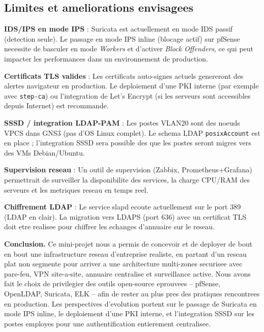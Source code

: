 \documentclass[11pt,a4paper]{article}
\begin{document}
\subsection{Limites et ameliorations envisagees}

\textbf{IDS/IPS en mode IPS} : Suricata est actuellement en mode IDS passif (detection seule). Le passage en mode IPS inline (blocage actif) sur pfSense necessite de basculer en mode \textit{Workers} et d'activer \textit{Block Offenders}, ce qui peut impacter les performances dans un environnement de production.

\textbf{Certificats TLS valides} : Les certificats auto-signes actuels genereront des alertes navigateur en production. Le deploiement d'une PKI interne (par exemple avec \texttt{step-ca}) ou l'integration de Let's Encrypt (si les serveurs sont accessibles depuis Internet) est recommande.

\textbf{SSSD / integration LDAP-PAM} : Les postes VLAN20 sont des noeuds VPCS dans GNS3 (pas d'OS Linux complet). Le schema LDAP \texttt{posixAccount} est en place ; l'integration SSSD sera possible des que les postes seront migres vers des VMs Debian/Ubuntu.

\textbf{Supervision reseau} : Un outil de supervision (Zabbix, Prometheus+Grafana) permettrait de surveiller la disponibilite des services, la charge CPU/RAM des serveurs et les metriques reseau en temps reel.

\textbf{Chiffrement LDAP} : Le service slapd ecoute actuellement sur le port 389 (LDAP en clair). La migration vers LDAPS (port 636) avec un certificat TLS doit etre realisee pour chiffrer les echanges d'annuaire sur le reseau.

\vspace{1.5em}
\begin{tcolorbox}[colback=primarylight,colframe=primary,arc=5pt,boxrule=0.8pt,
  left=10pt,right=10pt,top=8pt,bottom=8pt]
\textbf{Conclusion.} Ce mini-projet nous a permis de concevoir et de deployer de bout en bout une infrastructure reseau d'entreprise realiste, en partant d'un reseau plat non segmente pour arriver a une architecture multi-zones securisee avec pare-feu, VPN site-a-site, annuaire centralise et surveillance active. Nous avons fait le choix de privilegier des outils open-source eprouvees -- pfSense, OpenLDAP, Suricata, ELK -- afin de rester au plus pres des pratiques rencontrees en production. Les perspectives d'evolution portent sur le passage de Suricata en mode IPS inline, le deploiement d'une PKI interne, et l'integration SSSD sur les postes employes pour une authentification entierement centralisee.
\end{tcolorbox}
\end{document}
